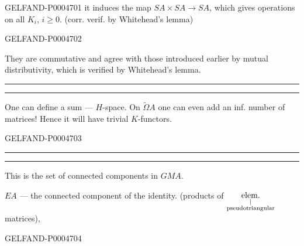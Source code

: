 \begin{GelfandAdjacentEvidence}{GELFAND-P000470}{1}
it induces the map $SA\times SA\longrightarrow SA$,
which gives operations on all $K_i$, $i\geqslant0$. (corr. verif. by Whitehead's lemma)
\end{GelfandAdjacentEvidence}
\begin{GelfandAdjacentEvidence}{GELFAND-P000470}{2}

They are commutative and agree with those introduced earlier by mutual distributivity, which is verified by Whitehead's lemma.

{\centering\rule{2em}{.4pt}\quad\textperiodcentered\quad\rule{3.4em}{.4pt}\par}
One can define a sum — $H$-space.
On $\widetilde\Omega A$ one can even add an inf. number of matrices!
Hence it will have trivial $K$-functors.
\end{GelfandAdjacentEvidence}
\begin{GelfandAdjacentEvidence}{GELFAND-P000470}{3}


{\centering\rule{2.4em}{.4pt}\quad\textperiodcentered\quad\rule{3.1em}{.4pt}\par}

This is the set of connected components in $GMA$.

$EA$ — the connected component of the identity. (products of \(\underset{\substack{\vert\\\text{\scriptsize pseudotriangular}}}{\text{elem.}}\) matrices),
\end{GelfandAdjacentEvidence}
\begin{GelfandAdjacentEvidence}{GELFAND-P000470}{4}


\end{GelfandAdjacentEvidence}
